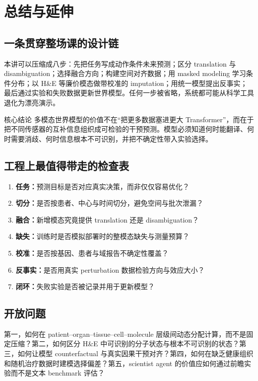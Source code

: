 \section{总结与延伸}

\subsection{一条贯穿整场课的设计链}

本讲可以压缩成八步：先把任务写成动作条件未来预测；区分 translation 与 disambiguation；选择融合方向；构建空间对齐数据；用 masked modeling 学习条件分布；以 H\&E 等廉价模态做带校准的 imputation；用统一模型提出反事实；最后通过实验和失败数据更新世界模型。任何一步被省略，系统都可能从科学工具退化为漂亮演示。

\begin{importantbox}{核心结论}
多模态世界模型的价值不在“把更多数据塞进更大 Transformer”，而在于把不同传感器的互补信息组织成可检验的干预预测。模型必须知道何时能翻译、何时需要消歧、何时信息根本不可识别，并把不确定性带入实验选择。
\end{importantbox}

\subsection{工程上最值得带走的检查表}

\begin{enumerate}
  \item \textbf{任务：}预测目标是否对应真实决策，而非仅仅容易优化？
  \item \textbf{切分：}是否按患者、中心与时间切分，避免空间与批次泄漏？
  \item \textbf{融合：}新增模态究竟提供 translation 还是 disambiguation？
  \item \textbf{缺失：}训练时是否模拟部署时的整模态缺失与测量预算？
  \item \textbf{校准：}是否按基因、患者与域报告不确定性覆盖？
  \item \textbf{反事实：}是否用真实 perturbation 数据检验方向与效应大小？
  \item \textbf{闭环：}失败实验是否被记录并用于更新模型？
\end{enumerate}

\subsection{开放问题}

第一，如何在 patient--organ--tissue--cell--molecule 层级间动态分配计算，而不是固定压缩？第二，如何区分 H\&E 中可识别的分子状态与根本不可识别的状态？第三，如何让模型 counterfactual 与真实因果干预对齐？第四，如何在缺乏健康组织和随机治疗数据时建模选择偏差？第五，scientist agent 的价值应如何通过前瞻实验而不是文本 benchmark 评估？

